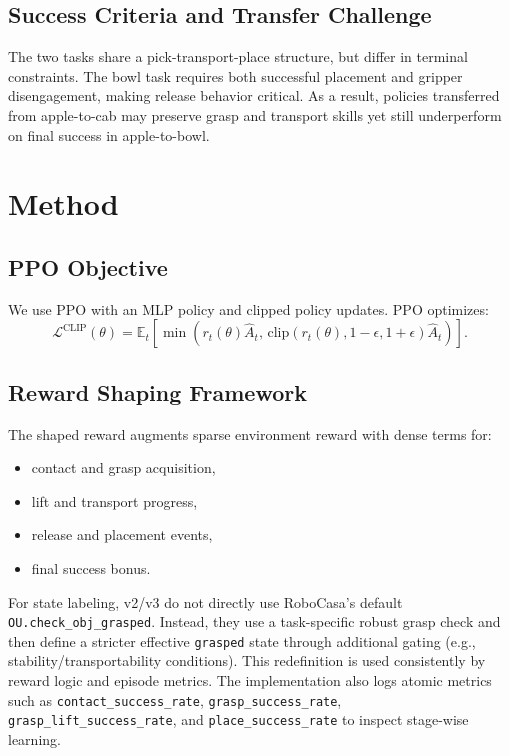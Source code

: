 \documentclass[11pt,a4paper]{article}
\begin{document}
\subsection{Success Criteria and Transfer Challenge}
The two tasks share a pick-transport-place structure, but differ in terminal constraints. The bowl task requires both successful placement and gripper disengagement, making release behavior critical. As a result, policies transferred from apple-to-cab may preserve grasp and transport skills yet still underperform on final success in apple-to-bowl.

\section{Method}
\subsection{PPO Objective}
We use PPO with an MLP policy and clipped policy updates. PPO optimizes:
\[
\mathcal{L}^{\text{CLIP}}(\theta) =
\mathbb{E}_t\left[
\min\left(r_t(\theta)\hat{A}_t,\,
\text{clip}(r_t(\theta), 1-\epsilon, 1+\epsilon)\hat{A}_t\right)
\right].
\]

\subsection{Reward Shaping Framework}
The shaped reward augments sparse environment reward with dense terms for:
\begin{itemize}
    \item contact and grasp acquisition,
    \item lift and transport progress,
    \item release and placement events,
    \item final success bonus.
\end{itemize}
For state labeling, v2/v3 do not directly use RoboCasa's default \texttt{OU.check\_obj\_grasped}. Instead, they use a task-specific robust grasp check and then define a stricter effective \texttt{grasped} state through additional gating (e.g., stability/transportability conditions). This redefinition is used consistently by reward logic and episode metrics.
The implementation also logs atomic metrics such as \texttt{contact\_success\_rate}, \texttt{grasp\_success\_rate}, \texttt{grasp\_lift\_success\_rate}, and \texttt{place\_success\_rate} to inspect stage-wise learning.
\end{document}
